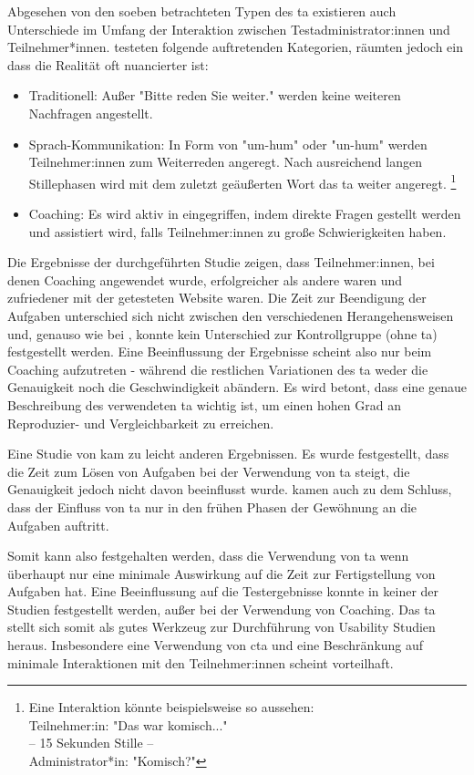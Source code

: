Abgesehen von den soeben betrachteten Typen des \acl{ta} existieren auch Unterschiede im Umfang der
Interaktion zwischen Testadministrator:innen und Teilnehmer*innen.
\textcite{olmsted-hawalaThinkaloudProtocols2010} testeten folgende auftretenden Kategorien, räumten
jedoch ein dass die Realität oft nuancierter ist:
\begin{itemize}
  \item Traditionell: Außer "Bitte reden Sie weiter." werden keine weiteren Nachfragen angestellt.
  \item Sprach-Kommunikation: In Form von "um-hum" oder "un-hum" werden Teilnehmer:innen zum
        Weiterreden angeregt. Nach ausreichend langen Stillephasen wird mit dem zuletzt geäußerten Wort
        das \acl{ta} weiter angeregt. \footnote{Eine Interaktion könnte beispielsweise so aussehen:\\
          Teilnehmer:in: "Das war komisch..." \\ -- 15 Sekunden Stille -- \\ Administrator*in: "Komisch?"}
  \item Coaching: Es wird aktiv in eingegriffen, indem direkte Fragen gestellt werden und assistiert
        wird, falls Teilnehmer:innen zu große Schwierigkeiten haben.
\end{itemize}
Die Ergebnisse der \citeyear{olmsted-hawalaThinkaloudProtocols2010} durchgeführten Studie zeigen,
dass Teilnehmer:innen, bei denen Coaching angewendet wurde, erfolgreicher als andere waren und
zufriedener mit der getesteten Website waren. Die Zeit zur Beendigung der Aufgaben unterschied sich
nicht zwischen den verschiedenen Herangehensweisen und, genauso wie bei
\citeauthor{alhadretiRethinkingThinking2018}, konnte kein Unterschied zur Kontrollgruppe (ohne
\ac{ta}) festgestellt werden. Eine Beeinflussung der Ergebnisse scheint also nur beim Coaching
aufzutreten - während die restlichen Variationen des \ac{ta} weder die Genauigkeit noch die
Geschwindigkeit abändern. Es wird betont, dass eine genaue Beschreibung des verwendeten \acl{ta}
wichtig ist, um einen hohen Grad an Reproduzier- und Vergleichbarkeit zu erreichen.

Eine Studie von \textcite{rheniusEvaluationConcurrent1990} kam zu leicht anderen Ergebnissen. Es
wurde festgestellt, dass die Zeit zum Lösen von Aufgaben bei der Verwendung von \ac{ta} steigt, die
Genauigkeit jedoch nicht davon beeinflusst wurde. \citeauthor{rheniusEvaluationConcurrent1990} kamen
auch zu dem Schluss, dass der Einfluss von \ac{ta} nur in den frühen Phasen der Gewöhnung an die
Aufgaben auftritt.
\parencite{rheniusEvaluationConcurrent1990}

Somit kann also festgehalten werden, dass die Verwendung von \ac{ta} wenn überhaupt nur eine
minimale Auswirkung auf die Zeit zur Fertigstellung von Aufgaben hat. Eine Beeinflussung auf die
Testergebnisse konnte in keiner der Studien festgestellt werden, außer bei der Verwendung von
Coaching. Das \acl{ta} stellt sich somit als gutes Werkzeug zur Durchführung von Usability Studien
heraus. Insbesondere eine Verwendung von \acl{cta} und eine Beschränkung auf minimale Interaktionen
mit den Teilnehmer:innen scheint vorteilhaft.
